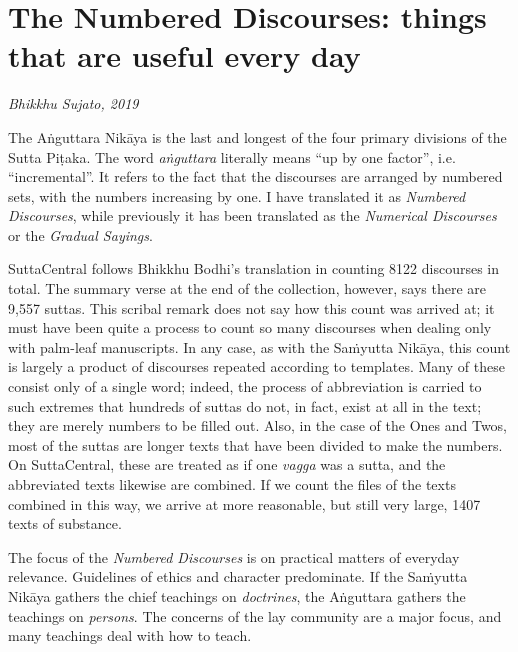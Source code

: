 \documentclass[12pt,openany]{book}%
\newcommand*{\scbyline}[1]{\begin{flushright}\textit{#1}\end{flushright}\bigskip}
\begin{document}
%
\chapter*{The Numbered Discourses: things that are useful every day}

\scbyline{Bhikkhu Sujato, 2019}

The \textsanskrit{Aṅguttara} \textsanskrit{Nikāya} is the last and longest of the four primary divisions of the Sutta \textsanskrit{Piṭaka}. The word \textit{\textsanskrit{aṅguttara}} literally means “up by one factor”, i.e. “incremental”. It refers to the fact that the discourses are arranged by numbered sets, with the numbers increasing by one. I have translated it as \textit{Numbered Discourses}, while previously it has been translated as the \textit{Numerical Discourses} or the \textit{Gradual Sayings}.

SuttaCentral follows Bhikkhu Bodhi’s translation in counting 8122 discourses in total. The summary verse at the end of the collection, however, says there are 9,557 suttas. This scribal remark does not say how this count was arrived at; it must have been quite a process to count so many discourses when dealing only with palm-leaf manuscripts. In any case, as with the \textsanskrit{Saṁyutta} \textsanskrit{Nikāya}, this count is largely a product of discourses repeated according to templates. Many of these consist only of a single word; indeed, the process of abbreviation is carried to such extremes that hundreds of suttas do not, in fact, exist at all in the text; they are merely numbers to be filled out. Also, in the case of the Ones and Twos, most of the suttas are longer texts that have been divided to make the numbers. On SuttaCentral, these are treated as if one \textit{vagga} was a sutta, and the abbreviated texts likewise are combined. If we count the files of the texts combined in this way, we arrive at more reasonable, but still very large, 1407 texts of substance.

The focus of the \textit{Numbered Discourses} is on practical matters of everyday relevance. Guidelines of ethics and character predominate. If the \textsanskrit{Saṁyutta} \textsanskrit{Nikāya} gathers the chief teachings on \emph{doctrines}, the \textsanskrit{Aṅguttara} gathers the teachings on \emph{persons}. The concerns of the lay community are a major focus, and many teachings deal with how to teach.
\end{document}
